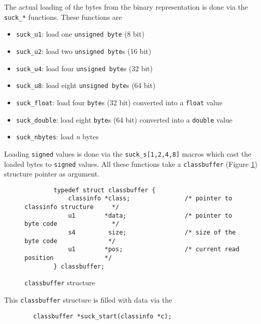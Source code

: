 The actual loading of the bytes from the binary representation is done
via the \texttt{suck\_*} functions. These functions are

\begin{itemize}
 \item \texttt{suck\_u1}: load one \texttt{unsigned byte} (8 bit)

 \item \texttt{suck\_u2}: load two \texttt{unsigned byte}s (16 bit)

 \item \texttt{suck\_u4}: load four \texttt{unsigned byte}s (32 bit)

 \item \texttt{suck\_u8}: load eight \texttt{unsigned byte}s (64 bit)

 \item \texttt{suck\_float}: load four \texttt{byte}s (32 bit)
 converted into a \texttt{float} value

 \item \texttt{suck\_double}: load eight \texttt{byte}s (64 bit)
 converted into a \texttt{double} value

 \item \texttt{suck\_nbytes}: load \textit{n} bytes
\end{itemize}

Loading \texttt{signed} values is done via the
\texttt{suck\_s[1,2,4,8]} macros which cast the loaded bytes to
\texttt{signed} values. All these functions take a
\texttt{classbuffer} (Figure \ref{classbufferstructure}) structure
pointer as argument.

\begin{figure}[h]
\begin{verbatim}
        typedef struct classbuffer {
            classinfo *class;               /* pointer to classinfo structure     */
            u1        *data;                /* pointer to byte code               */
            s4         size;                /* size of the byte code              */
            u1        *pos;                 /* current read position              */
        } classbuffer;
\end{verbatim}
\caption{\texttt{classbuffer} structure}
\label{classbufferstructure}
\end{figure}

This \texttt{classbuffer} structure is filled with data via the

\begin{verbatim}
        classbuffer *suck_start(classinfo *c);
\end{verbatim}


